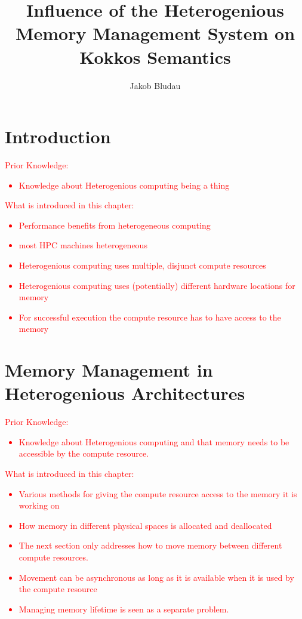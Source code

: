 \documentclass[a4paper,10pt]{scrartcl}
\title{Influence of the Heterogenious Memory Management System on Kokkos Semantics }
\author{Jakob Bludau}
\newcommand\gist[1]{\textcolor{red}{#1}}
\begin{document}
\maketitle

\section{Introduction}
\gist{
  Prior Knowledge:
\begin{itemize}
\item Knowledge about Heterogenious computing being a thing
\end{itemize}
  What is introduced in this chapter:
\begin{itemize}
\item Performance benefits from heterogeneous computing
\item most HPC machines heterogeneous
\item Heterogenious computing uses multiple, disjunct compute resources
\item Heterogenious computing uses (potentially) different hardware locations for memory
\item For successful execution the compute resource has to have access to the memory
\end{itemize}
}

\section{Memory Management in Heterogenious Architectures}
\gist{
  Prior Knowledge:
\begin{itemize}
\item Knowledge about Heterogenious computing and that memory needs to be accessible by the compute resource.
\end{itemize}
  What is introduced in this chapter:
\begin{itemize}
\item Various methods for giving the compute resource access to the memory it is working on
\item How memory in different physical spaces is allocated and deallocated
\item The next section only addresses how to move memory between different compute resources.
\item Movement can be asynchronous as long as it is available when it is used by the compute resource
\item Managing memory lifetime is seen as a separate problem.
\end{itemize}
}
\end{document}
